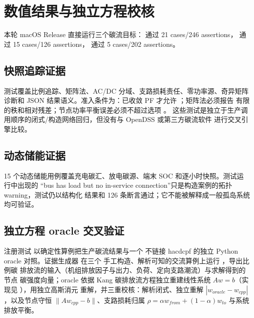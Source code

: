 \section{数值结果与独立方程校核}\label{sec:carbon-numerical}

本轮 macOS Release 直接运行三个碳流目标：
 通过 21 cases/246 assertions，
 通过 15 cases/126 assertions，
 通过 5 cases/202 assertions。

\subsection{快照追踪证据}
测试覆盖比例追踪、矩阵法、AC/DC 分域、支路损耗责任、零功率源、奇异矩阵诊断和 JSON
结果语义。准入条件为：已收敛 PF 才允许 ；矩阵法必须报告
有限的秩和相对残差；节点功率平衡误差必须不超过选项 。
这些测试是独立于生产调用顺序的闭式/构造网络回归，但没有与 OpenDSS 或第三方碳流软件
进行交叉引擎比较。

\subsection{动态储能证据}
15 个动态储能用例覆盖充电碳汇、放电碳源、端末 SOC 和逐小时快照。测试运行中出现的
“bus has load but no in-service connection”只是构造案例的拓扑 warning，测试仍以结构化
结果和 126 条断言通过；它不能被解释成一般孤岛系统均可验证。

\subsection{独立方程 oracle 交叉验证}\label{sec:carbon-xref}
注册测试  以确定性算例把生产碳流结果与一个
不链接 hacdcpf 的独立 Python oracle 对照。证据生成器
 在三个
手工构造、解析可知的交流算例上运行
，导出比例碳
排放流的输入（机组排放因子与出力、负荷、定向支路潮流）与求解得到的节点
碳强度向量；oracle  依据
Kang 碳排放流方程独立重建线性系统 $Aw=b$（实现见
），用独立高斯消元
重解，并三重校核：解析闭式、独立重解 $|w_{oracle}-w_{cpp}|$，以及节点守恒
$\|Aw_{cpp}-b\|$、支路损耗归属 $\rho=\alpha w_{from}+(1-\alpha)w_{to}$ 与系统排放平衡。

